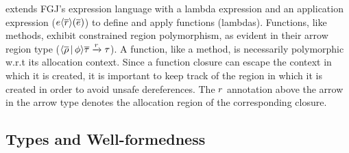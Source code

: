 \FB extends FGJ's expression language with a lambda expression and an
application expression ($e\langle \overline{r} \rangle(\overline{e})$) to define
and apply functions (lambdas). Functions, like methods, exhibit
constrained region polymorphism, as evident in their arrow region type
($\langle \overline{\rho} \,|\, \phi \rangle\overline{\tau} \xrightarrow{r}
\tau$).
A function, like a method, is necessarily polymorphic w.r.t its
allocation context.  Since a function closure can escape the context
in which it is created, it is important to keep track of the region in
which it is created in order to avoid unsafe dereferences. The $r$
annotation above the arrow in the arrow type denotes the allocation
region of the corresponding closure. 

\subsection{Types and Well-formedness}

